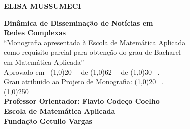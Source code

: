 \documentclass[a4paper,12pt]{article}
\begin{document}
\begin{titlepage}
 \begin{center}
 
  {\bf \large ELISA MUSSUMECI}\\[0.3cm]

  \vspace{25 mm}

  {\bf \large Dinâmica de Disseminação de Notícias em}\\[0.1cm]
  {\bf \large Redes Complexas}\\[4cm]

  {“Monografia apresentada à Escola de Matemática Aplicada}\\[0.1cm]
  {como requisito parcial para obtenção do grau de Bacharel }\\[0.1cm]
  {em Matemática Aplicada”}\\[6cm]


  {Aprovado em \ \line(1,0){20} \ \ de \line(1,0){62} \ \ de \line(1,0){30} \ .}\\[0.1cm]
  {Grau atribuido ao Projeto de Monografia: \line(1,0){20} \ . }\\[3cm]
  
  
  {\line(1,0){250}}\\
  {\bf Professor Orientador: Flavio Codeço Coelho}\\[0.1cm]
  {\bf Escola de Matemática Aplicada}\\[0.1cm]
  {\bf Fundação Getulio Vargas}
 \end{center}
\end{titlepage}

\newpage\null\thispagestyle{empty}\newpage

\tableofcontents

\pagebreak

\begin{abstract}
 
O processo de formação de opinião, nos dias de hoje, é fortemente influenciado pela mídia digital.
Entretanto pouco se sabe sobre o processo de disseminação de notícias e os fatores que determinam o alcance de cada
notícia.

A disseminação de uma notícia se dá por meio de um ou mais caminhos em uma rede desconhecida de influência entre 
formadores de opinião (produtores de notícias). Este padrão pode ser recuperado, com algum grau de incerteza, a partir de dados
da sequência temporal das publicações sobre um mesmo tema, e dos links nelas contidos.

Este projeto tem como objetivo caracterizar as redes de interligação de veículos de mídia e modelar a dinâmica do espalhamento 
de notícias, a fim de prever tendências e mapear questões de interesse.

\end{abstract}
\end{document}
